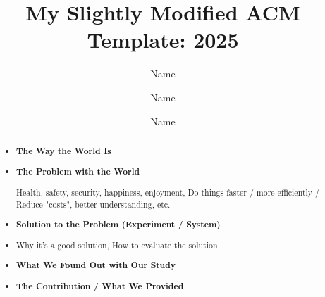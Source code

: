 \documentclass[sigconf, screen, review]{acmart}
\begin{document}

\title[shorty]{My Slightly Modified ACM Template: 2025}

\author{Name}
\author{Name}
\author{Name}

\renewcommand{\shortauthors}{FIRST et al.}

\begin{abstract}
	\begin{itemize}[label={}, leftmargin=0pt,itemsep=0pt, parsep=0pt] %
		\item \textbf{The Way the World Is}
		\item \textbf{The Problem with the World}
		      \par Health, safety, security, happiness, enjoyment, Do things faster / more efficiently / Reduce "costs", better understanding, etc.
		\item \textbf{Solution to the Problem (Experiment / System)}
		\item Why it’s a good solution, How to evaluate the solution
		\item \textbf{What We Found Out with Our Study}
		\item \textbf{The Contribution / What We Provided}
	\end{itemize}
\end{abstract}
\end{document}
